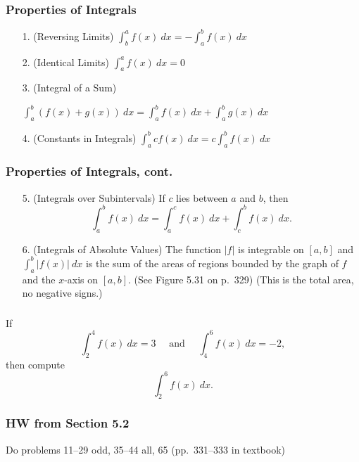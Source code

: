 \documentclass[14pt]{beamer}
\newcommand{\dint}{\displaystyle\int}
\begin{document}
\begin{frame}
\frametitle{\small Properties of Integrals}
\footnotesize
\begin{itemize}
\item[1.] (Reversing Limits) $\dint_b^a f(x)\ dx = -\dint_a^b f(x)\ dx$

\vspace{0.75pc}
\item[2.] (Identical Limits) $\dint_a^a f(x)\ dx = 0$

\vspace{0.75pc}
\item[3.] (Integral of a Sum) 

$\dint_a^b (f(x)+g(x))\ dx = \dint_a^b f(x)\ dx + \dint_a^b g(x)\ dx$

\vspace{0.75pc}
\item[4.] (Constants in Integrals) $\dint_a^b cf(x)\ dx = c \dint_a^b f(x)\ dx$
\end{itemize}
\end{frame}

\begin{frame}
\frametitle{\small Properties of Integrals, cont.}
\footnotesize
\begin{itemize}

\item[5.] (Integrals over Subintervals) If $c$ lies between $a$ and $b$, then
$$\dint_a^b f(x)\ dx = \dint_a^c f(x)\ dx + \dint_c^b f(x)\ dx.$$

\item[6.] (Integrals of Absolute Values) The function $|f|$ is integrable on $[a,b]$ and $\dint_a^b |f(x)|\ dx$ is the sum of the areas of regions bounded by the graph of $f$ and the $x$-axis on $[a,b]$.  (See Figure 5.31 on p.\ 329) \alert{(This is the total area, no negative signs.)}
\end{itemize}
\end{frame}

\begin{frame}%
\frametitle{}
\small
\begin{exe} If 
\[\dint_2^4 f(x)\ dx = 3\quad\text{ and }\quad \dint_4^6 f(x)\ dx = -2,\] 
then compute 
\[\dint_2^6 f(x)\ dx.\] \end{exe}
\end{frame}

\begin{frame}
\frametitle{HW from Section 5.2}
Do problems 11--29 odd, 35--44 all, 65 (pp.\ 331--333 in textbook)
\end{frame}
\end{document}

